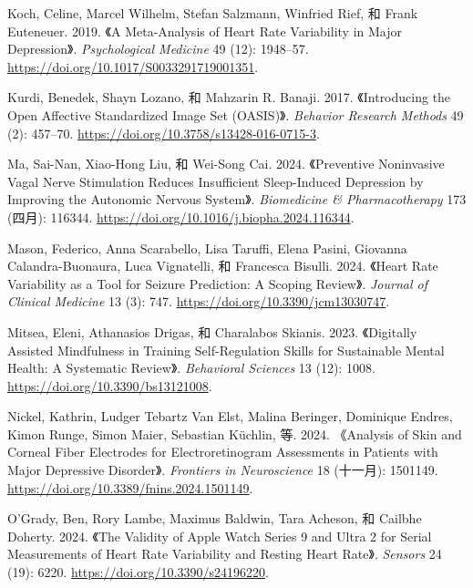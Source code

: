 \documentclass[
  Letterpaper,
]{scrbook}
\newlength{\cslhangindent}
\newenvironment{CSLReferences}[2] %
 {\begin{list}{}{%
  \setlength{\itemindent}{0pt}
  \setlength{\leftmargin}{0pt}
  \setlength{\parsep}{0pt}
  \ifodd #1
   \setlength{\leftmargin}{\cslhangindent}
   \setlength{\itemindent}{-1\cslhangindent}
  \fi
  \setlength{\itemsep}{#2\baselineskip}}}
 {\end{list}}
\begin{document}
\begin{CSLReferences}{1}{0}
Koch, Celine, Marcel Wilhelm, Stefan Salzmann, Winfried Rief, 和 Frank
Euteneuer. 2019. {《A Meta-Analysis of Heart Rate Variability in Major
Depression》}. \emph{Psychological Medicine} 49 (12): 1948--57.
\url{https://doi.org/10.1017/S0033291719001351}.

Kurdi, Benedek, Shayn Lozano, 和 Mahzarin R. Banaji. 2017.
{《Introducing the {Open Affective Standardized Image Set} ({OASIS})》}.
\emph{Behavior Research Methods} 49 (2): 457--70.
\url{https://doi.org/10.3758/s13428-016-0715-3}.

Ma, Sai-Nan, Xiao-Hong Liu, 和 Wei-Song Cai. 2024. {《Preventive
Noninvasive Vagal Nerve Stimulation Reduces Insufficient Sleep-Induced
Depression by Improving the Autonomic Nervous System》}.
\emph{Biomedicine \& Pharmacotherapy} 173 (四月): 116344.
\url{https://doi.org/10.1016/j.biopha.2024.116344}.

Mason, Federico, Anna Scarabello, Lisa Taruffi, Elena Pasini, Giovanna
Calandra-Buonaura, Luca Vignatelli, 和 Francesca Bisulli. 2024. {《Heart
{Rate Variability} as a {Tool} for {Seizure Prediction}: {A Scoping
Review}》}. \emph{Journal of Clinical Medicine} 13 (3): 747.
\url{https://doi.org/10.3390/jcm13030747}.

Mitsea, Eleni, Athanasios Drigas, 和 Charalabos Skianis. 2023.
{《Digitally {Assisted Mindfulness} in {Training Self-Regulation Skills}
for {Sustainable Mental Health}: {A Systematic Review}》}.
\emph{Behavioral Sciences} 13 (12): 1008.
\url{https://doi.org/10.3390/bs13121008}.

Nickel, Kathrin, Ludger Tebartz Van Elst, Malina Beringer, Dominique
Endres, Kimon Runge, Simon Maier, Sebastian Küchlin, 等. 2024.
{《Analysis of Skin and Corneal Fiber Electrodes for Electroretinogram
Assessments in Patients with Major Depressive Disorder》}.
\emph{Frontiers in Neuroscience} 18 (十一月): 1501149.
\url{https://doi.org/10.3389/fnins.2024.1501149}.

O'Grady, Ben, Rory Lambe, Maximus Baldwin, Tara Acheson, 和 Cailbhe
Doherty. 2024. {《The {Validity} of {Apple Watch Series} 9 and {Ultra} 2
for {Serial Measurements} of {Heart Rate Variability} and {Resting Heart
Rate}》}. \emph{Sensors} 24 (19): 6220.
\url{https://doi.org/10.3390/s24196220}.


\end{CSLReferences}
\end{document}
